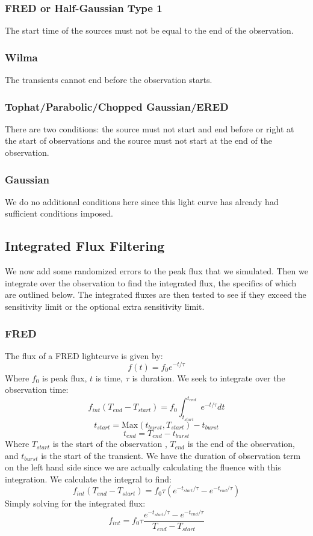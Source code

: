 \documentclass{article}
\begin{document}
\subsubsection{FRED or Half-Gaussian Type 1}
The start time of the sources must not be equal to the end of the observation.
\subsubsection{Wilma}
The transients cannot end before the observation starts.
\subsubsection{Tophat/Parabolic/Chopped Gaussian/ERED}
There are two conditions: the source must not start and end before or right at the start of observations and the source must not start at the end of the observation.
\subsubsection{Gaussian}
We do no additional conditions here since this light curve has already had sufficient conditions imposed.
\subsection{Integrated Flux Filtering}
We now add some randomized errors to the peak flux that we simulated. Then we integrate over the observation to find the integrated flux, the specifics of which are outlined below. The integrated fluxes are then tested to see if they exceed the sensitivity limit or the optional extra sensitivity limit. 
\subsubsection{FRED}
The flux of a FRED lightcurve is given by:
\[f(t)=f_0e^{-t/\tau}\]
Where $f_0$ is peak flux, $t$ is time, $\tau$ is duration. We seek to integrate over the observation time:
\[f_{int}(T_{end}-T_{start}) = f_0\int_{t_{start}}^{t_{end}}e^{-t/\tau}dt\]
\[t_{start} = \text{Max}(t_{burst}, T_{start}) - t_{burst}\]
\[t_{end} = T_{end} - t_{burst}\]
Where $T_{start}$ is the start  of the observation , $T_{end}$ is the end of the observation, and $t_{burst}$ is the start of the transient. We have the duration of observation term on the left hand side since we are actually calculating the fluence with this integration. We calculate the integral to find:
\[f_{int}(T_{end}-T_{start}) = f_0\tau (e^{-t_{start}/\tau}-e^{-t_{end}/\tau})\]
Simply solving for the integrated flux:
\[f_{int} = f_0\tau \frac{e^{-t_{start}/\tau}-e^{-t_{end}/\tau}}{T_{end}-T_{start}}\]
\end{document}
